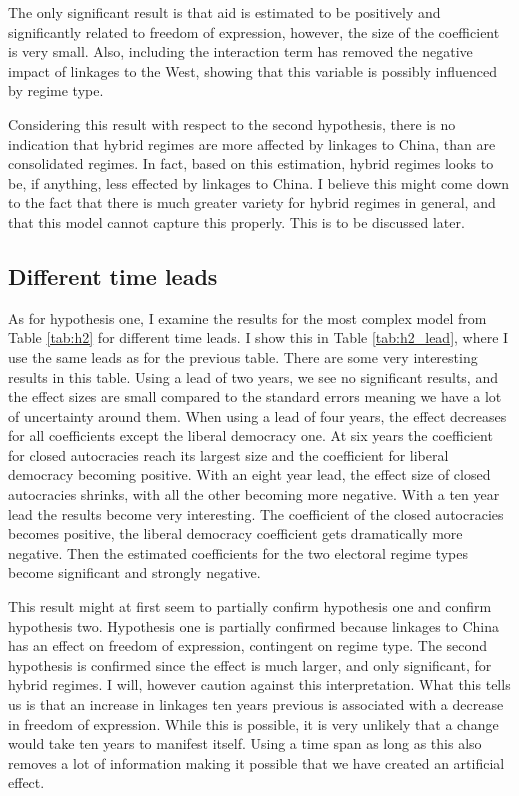 The only significant result is that aid is estimated to be positively and significantly related to freedom of expression, however, the size of the coefficient is very small. Also, including the interaction term has removed the negative impact of linkages to the West, showing that this variable is possibly influenced by regime type. 

Considering this result with respect to the second hypothesis, there is no indication that hybrid regimes are more affected by linkages to China, than are consolidated regimes. In fact, based on this estimation, hybrid regimes looks to be, if anything, less effected by linkages to China. I believe this might come down to the fact that there is much greater variety for hybrid regimes in general, and that this model cannot capture this properly. This is to be discussed later. 


\subsection{Different time leads}
As for hypothesis one, I examine the results for the most complex model from Table \ref{tab:h2} for different time leads. I show this in Table \ref{tab:h2_lead}, where I use the same leads as for the previous table. There are some very interesting results in this table. Using a lead of two years, we see no significant results, and the effect sizes are small compared to the standard errors meaning we have a lot of uncertainty around them. When using a lead of four years, the effect decreases for all coefficients except the liberal democracy one. At six years the coefficient for closed autocracies reach its largest size and the coefficient for liberal democracy becoming positive. With an eight year lead, the effect size of closed autocracies shrinks, with all the other becoming more negative. With a ten year lead the results become very interesting. The coefficient of the closed autocracies becomes positive, the liberal democracy coefficient gets dramatically more negative. Then the estimated coefficients for the two electoral regime types become significant and strongly negative.

This result might at first seem to partially confirm hypothesis one and confirm hypothesis two. Hypothesis one is partially confirmed because linkages to China has an effect on freedom of expression, contingent on regime type. The second hypothesis is confirmed since the effect is much larger, and only significant, for hybrid regimes. I will, however caution against this interpretation. What this tells us is that an increase in linkages ten years previous is associated with a decrease in freedom of expression. While this is possible, it is very unlikely that a change would take ten years to manifest itself. Using a time span as long as this also removes a lot of information making it possible that we have created an artificial effect.


